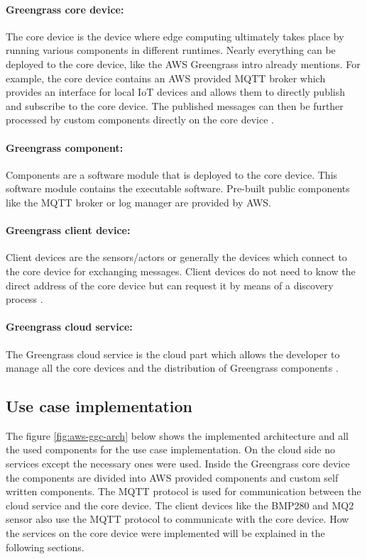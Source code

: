 \paragraph{Greengrass core device:}
The core device is the device where edge computing ultimately takes place by running various components in different runtimes. Nearly everything can be deployed to the core device, like the \gls{AWS} Greengrass intro already mentions. For example, the core device contains an AWS provided MQTT broker which provides an interface for local IoT devices and allows them to directly publish and subscribe to the core device. The published messages can then be further processed by custom components directly on the core device \cite{AmazonWebServicesHowItWorks}.

\paragraph{Greengrass component:} Components are a software module that is deployed to the core device. This software module contains the executable software. Pre-built public components like the MQTT broker or log manager are provided by \gls{AWS}.
\cite{AmazonWebServicesHowItWorks}

\paragraph{Greengrass client device:} Client devices are the sensors/actors or generally the devices which connect to the core device for exchanging messages. Client devices do not need to know the direct address of the core device but can request it by means of a discovery process \cite{AmazonWebServicesHowItWorks}.

\paragraph{Greengrass cloud service:} The Greengrass cloud service is the cloud part which allows the developer to manage all the core devices and the distribution of Greengrass components \cite{AmazonWebServicesHowItWorks}.

\newpage
\subsection{Use case implementation}
The figure \ref{fig:aws-ggc-arch} below shows the implemented architecture and all the used components for the use case implementation. On the cloud side no services except the necessary ones were used. Inside the Greengrass core device the components are divided into AWS provided components and custom self written components. The MQTT protocol is used for communication between the cloud service and the core device. The client devices like the BMP280 and MQ2 sensor also use the \gls{MQTT} protocol to communicate with the core device. How the services on the core device were implemented will be explained in the following sections.

